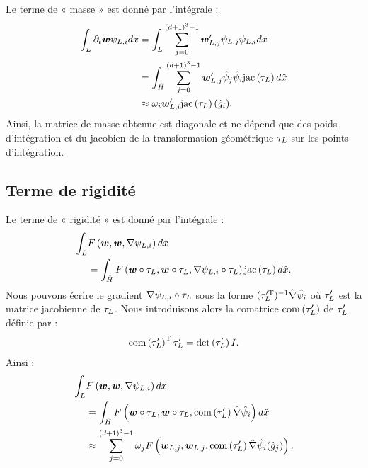 Le terme de « masse » est donné par l’intégrale :
\begin{equation}
	\begin{aligned}
		\int_{L} \partial_{t} \bm{w} \psi_{L,i} dx
		&= \int_{L} \sum_{j=0}^{(d + 1)^3 - 1}
			\bm{w}'_{L,j} \psi_{L,j} \psi_{L,i} dx \\
		&= \int_{\hat{H}} \sum_{j=0}^{(d + 1)^3 - 1}
			\bm{w}'_{L,j}
			\hat{\psi}_{j} \hat{\psi}_{i}
			\mathrm{jac}\left(\tau_{L}\right) d\hat{x} \\
		&\approx \omega_{i} \bm{w}'_{L,i}
			\mathrm{jac}\left(\tau_{L}\right) (\hat{g}_{i})
		\label{eq:terme_de_masse} .
	\end{aligned}
\end{equation}
Ainsi, la matrice de masse obtenue est diagonale et ne dépend que des poids
d’intégration et du jacobien de la transformation géométrique $\tau_{L}$
sur les points d’intégration.
\\


\subsection{Terme de rigidité}
\label{ssect:terme_de_rigidite}

Le terme de « rigidité » est donné par l’intégrale :
\begin{equation}
\begin{aligned}
	\int_{L} &F\left(\bm{w},\bm{w},\nabla \psi_{L,i}\right) dx \\ &=
	\int_{\hat{H}}
		F\left(\bm{w} \circ \tau_{L},\bm{w} \circ \tau_{L},\nabla \psi_{L,i} \circ \tau_{L}\right)
		\mathrm{jac}\left(\tau_{L}\right) d\hat{x} .
\end{aligned}
\end{equation}
Nous pouvons écrire le gradient $\nabla \psi_{L,i} \circ \tau_{L}$
sous la forme $(\tau_{L}'^{\mathrm{T}})^{-1} \hat{\nabla} \hat{\psi}_{i}$
où $\tau_{L}'$ est la matrice jacobienne de $\tau_{L}$.
Nous introduisons alors la comatrice $\mathrm{com}\left(\tau_{L}'\right)$ de
$\tau_{L}'$ définie par :
\begin{align}
	\mathrm{com}\left(\tau_{L}'\right)^{\mathrm{T}} \tau_{L}' =
	\det\left(\tau_{L}'\right) I
	\label{eq:comatrice} .
\end{align}
Ainsi :
\begin{equation}
	\begin{aligned}
		\int_{L} &F\left(\bm{w},\bm{w},\nabla \psi_{L,i}\right) dx \\ &=
		\int_{\hat{H}}
			F\left(\bm{w} \circ \tau_{L},\bm{w} \circ \tau_{L},\mathrm{com}\left(\tau_{L}'\right)
				\hat{\nabla} \hat{\psi}_{i}\right) d\hat{x} \\
		&\approx \sum_{j=0}^{(d + 1)^3 - 1}
			\omega_{j}
			F\left(\bm{w}_{L,j},\bm{w}_{L,j},\mathrm{com}\left(\tau_{L}'\right)
				\hat{\nabla} \hat{\psi}_{i}(\hat{g}_{j})\right)
		\label{eq:terme_de_rigidite} .
	\end{aligned}
\end{equation}


